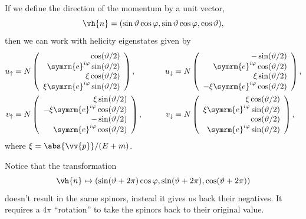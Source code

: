 \documentclass[fleqn]{NotesClass}
\newcommand{\e}{\symrm{e}}
\begin{document}
    If we define the direction of the momentum by a unit vector,
    \begin{equation}
        \vh{n} = (\sin\vartheta \cos\varphi, \sin\vartheta\cos\varphi, \cos\vartheta),
    \end{equation}
    then we can work with helicity eigenstates given by
    \begin{alignat}{2}
        u_{\uparrow} &= N \left(
        \begin{array}{r}
            \cos(\vartheta/2)\\
            \e^{i\varphi}\sin(\vartheta/2)\\
            \xi\cos(\vartheta/2)\\
            \xi\e^{i\varphi}\sin(\vartheta/2)
        \end{array}
        \right), \qquad & u_{\downarrow} &= N \left(
        \begin{array}{r}
            -\sin(\vartheta/2)\\
            \e^{i\varphi}\cos(\vartheta/2)\\
            \xi\sin(\vartheta/2)\\
            -\xi\e^{i\varphi}\cos(\vartheta/2)
        \end{array}
        \right),\\
        v_{\uparrow} &= N \left(
        \begin{array}{r}
            \xi\sin(\vartheta/2)\\
            -\xi\e^{i\varphi}\cos(\vartheta/2)\\
            -\sin(\vartheta/2)\\
            \e^{i\varphi}\cos(\vartheta/2)
        \end{array}
        \right), \qquad & v_{\downarrow} &= N \left(
        \begin{array}{r}
            \xi\cos(\vartheta/2)\\
            \xi\e^{i\varphi}\sin(\vartheta/2)\\
            \cos(\vartheta/2)\\
            \e^{i\varphi}\sin(\vartheta/2)
        \end{array}
        \right),
    \end{alignat}
    where \(\xi = \abs{\vv{p}}/(E + m)\).
    
    Notice that the transformation
    \begin{equation}
        \vh{n} \mapsto (\sin(\vartheta + 2\pi)\cos\varphi, \sin(\vartheta + 2\pi), \cos(\vartheta + 2\pi))
    \end{equation}
    doesn't result in the same spinors, instead it gives us back their negatives.
    It requires a \(4\pi\) \enquote{rotation} to take the spinors back to their original value.
    
\end{document}
